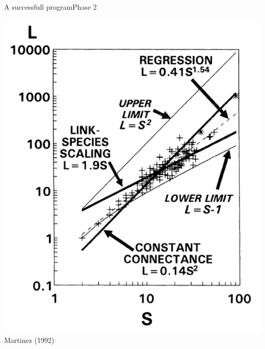 \documentclass{eecslides}
\begin{document}
	\begin{frame}{A successfull program}{Phase 2}
		\begin{center}
		\includegraphics[height=0.65\textheight]{link_scaling}\\
		\footnotesize{Martinez (1992)}\\
		\end{center}	
	\end{frame}

\end{document}
